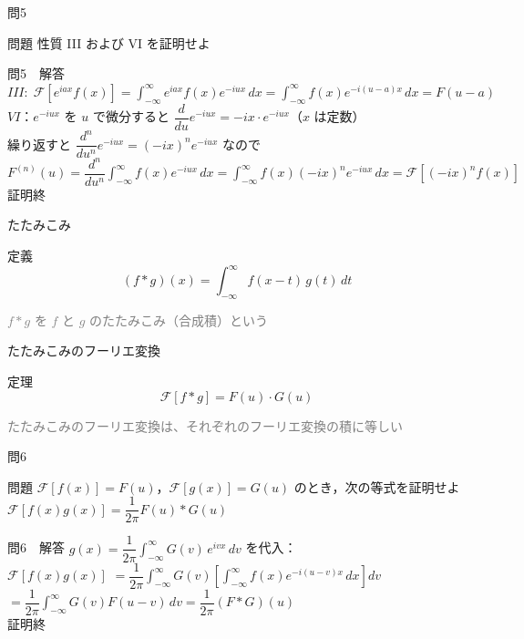 \documentclass[professionalfonts]{beamer}
\begin{document}
\begin{frame}{問5　}
  \begin{exampleblock}{問題}
    性質 III および VI を証明せよ
  \end{exampleblock}
\end{frame}

\begin{frame}{問5　解答}
  $III:\; \mathcal{F}[e^{iax}f(x)] = \displaystyle\int_{-\infty}^{\infty} e^{iax}f(x)e^{-iux}\,dx = \int_{-\infty}^{\infty} f(x)e^{-i(u-a)x}\,dx = F(u-a)$\\[8pt]
  $VI$：$e^{-iux}$ を $u$ で微分すると $\dfrac{d}{du}e^{-iux} = -ix\cdot e^{-iux}$（$x$ は定数）\\[4pt]
  繰り返すと $\dfrac{d^{n}}{du^{n}}e^{-iux} = (-ix)^{n}e^{-iux}$ なので\\[4pt]
  $F^{(n)}(u) = \dfrac{d^{n}}{du^{n}}\displaystyle\int_{-\infty}^{\infty} f(x)e^{-iux}\,dx = \int_{-\infty}^{\infty} f(x)(-ix)^{n}e^{-iux}\,dx = \mathcal{F}[(-ix)^{n}f(x)]$
  \\[6pt]\hfill 証明終
\end{frame}

\begin{frame}{たたみこみ}
  \begin{block}{定義}
  \[
    (f * g)(x) = \int_{-\infty}^{\infty} f(x-t)\,g(t)\,dt
  \]
  \end{block}
  {\footnotesize\textcolor{gray}{$f * g$ を $f$ と $g$ のたたみこみ（合成積）という}}
\end{frame}

\begin{frame}{たたみこみのフーリエ変換}
  \begin{block}{定理}
  \[
    \mathcal{F}[f * g] = F(u)\cdot G(u)
  \]
  \end{block}
  {\footnotesize\textcolor{gray}{たたみこみのフーリエ変換は、それぞれのフーリエ変換の積に等しい}}
\end{frame}

\begin{frame}{問6　}
  \begin{exampleblock}{問題}
    $\mathcal{F}[f(x)] = F(u)$，$\mathcal{F}[g(x)] = G(u)$ のとき，次の等式を証明せよ\\[6pt]
    $\mathcal{F}[f(x)g(x)] = \dfrac{1}{2\pi} F(u) * G(u)$
  \end{exampleblock}
\end{frame}

\begin{frame}{問6　解答}
  $g(x) = \dfrac{1}{2\pi}\displaystyle\int_{-\infty}^{\infty} G(v)\,e^{ivx}\,dv$ を代入：\\[6pt]
  $\mathcal{F}[f(x)g(x)]$
  $= \dfrac{1}{2\pi}\displaystyle\int_{-\infty}^{\infty} G(v)\!\left[\int_{-\infty}^{\infty} f(x)e^{-i(u-v)x}\,dx\right]dv$\\[4pt]
  $= \dfrac{1}{2\pi}\displaystyle\int_{-\infty}^{\infty} G(v)F(u-v)\,dv = \dfrac{1}{2\pi}(F*G)(u)$
  \\[8pt]\hfill 証明終
\end{frame}
\end{document}
